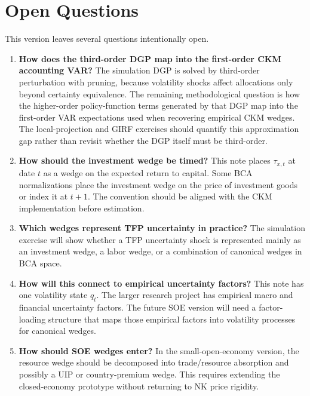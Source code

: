 \section{Open Questions}

This version leaves several questions intentionally open.

\begin{enumerate}[label=\textbf{Q\arabic*.}]
    \item \textbf{How does the third-order DGP map into the first-order CKM accounting VAR?}
    The simulation DGP is solved by third-order perturbation with pruning,
    because volatility shocks affect allocations only beyond certainty
    equivalence. The remaining methodological question is how the higher-order
    policy-function terms generated by that DGP map into the first-order VAR
    expectations used when recovering empirical CKM wedges. The local-projection
    and GIRF exercises should quantify this approximation gap rather than
    revisit whether the DGP itself must be third-order.

    \item \textbf{How should the investment wedge be timed?}
    This note places \(\tau_{x,t}\) at date \(t\) as a wedge on the expected
    return to capital. Some BCA normalizations place the investment wedge on the
    price of investment goods or index it at \(t+1\). The convention should be
    aligned with the CKM implementation before estimation.

    \item \textbf{Which wedges represent TFP uncertainty in practice?}
    The simulation exercise will show whether a TFP uncertainty shock is
    represented mainly as an investment wedge, a labor wedge, or a combination
    of canonical wedges in BCA space.

    \item \textbf{How will this connect to empirical uncertainty factors?}
    This note has one volatility state \(q_t\). The larger research project has
    empirical macro and financial uncertainty factors. The future SOE version
    will need a factor-loading structure that maps those empirical factors into
    volatility processes for canonical wedges.

    \item \textbf{How should SOE wedges enter?}
    In the small-open-economy version, the resource wedge should be decomposed
    into trade/resource absorption and possibly a UIP or country-premium wedge.
    This requires extending the closed-economy prototype without returning to
    NK price rigidity.
\end{enumerate}
